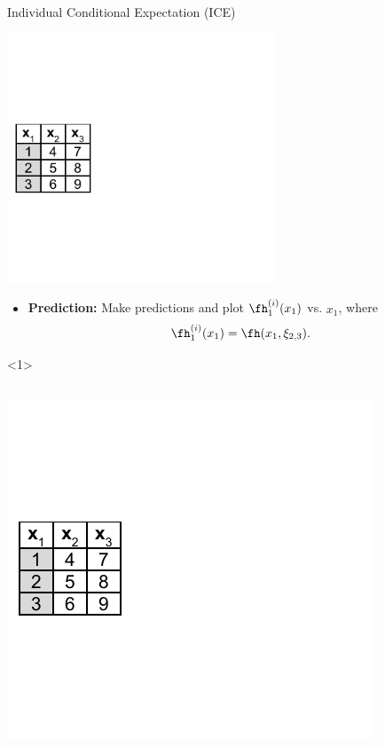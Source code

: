 \begin{vbframe}{Individual Conditional Expectation (ICE)}
\framebreak

\begin{center}
\includegraphics[page=3, width=0.6\textwidth]{figure_man/ice_pd_plot_demo}
\end{center}
\vspace{-0.5cm}
\begin{itemize}
\item \textbf{Prediction:} Make predictions and plot $\fh_{1}^{(i)}(x_1)$ vs. $x_1$, where $$\fh_{1}^{(i)}(x_1) = \fh(x_1, \xi_{2, 3}).$$
\end{itemize}

\framebreak
\begin{onlyenv}<1>
  \vspace{1cm}
    \begin{columns}[T]
    \begin{column}{0.5\textwidth}
  \centering
  \includegraphics[page=5, width=\textwidth]{figure_man/ice_pd_plot_demo}
  \end{column}
 \begin{column}{0.5\textwidth}
  \vspace{0.3cm}


\end{column}
\end{columns}
\end{onlyenv}
\end{vbframe}
